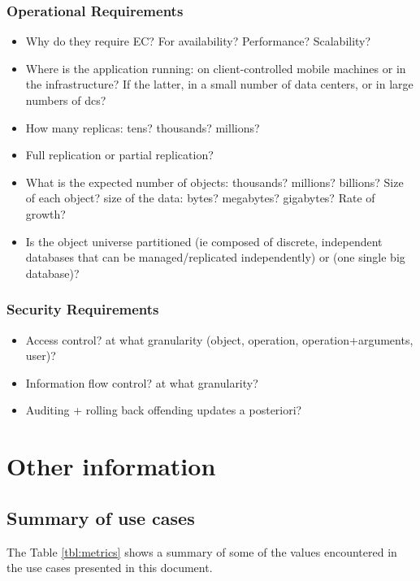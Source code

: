 \documentclass[11pt,a4paper]{report}
\begin{document}
\subsection{Operational Requirements}
\begin{itemize}
\item Why do they require EC?  For availability?  Performance?  Scalability?
\item Where is the application running: on client-controlled mobile machines or in the infrastructure? If the latter, in a small number of data centers, or in large numbers of \glspl{dc}?
\item How many replicas: tens?  thousands?  millions?
\item Full replication or partial replication?
\item What is the expected number of objects: thousands? millions? billions?  Size of each object?  size of the data: bytes? megabytes? gigabytes?  Rate of growth?
\item Is the object universe partitioned (ie composed of discrete, independent databases that can be managed/replicated independently) or (one single big database)?
\end{itemize}

\subsection{Security Requirements}
\begin{itemize}
\item Access control?  at what granularity (object, operation, operation+arguments, user)?
\item Information flow control?  at what granularity?
\item Auditing + rolling back offending updates a posteriori?
\end{itemize}


\chapter{Other information}
\section{Summary of use cases}
The Table \ref{tbl:metrics} shows a summary of some of the values encountered in the use cases presented in this document.




\label{LastPage}
\end{document}
